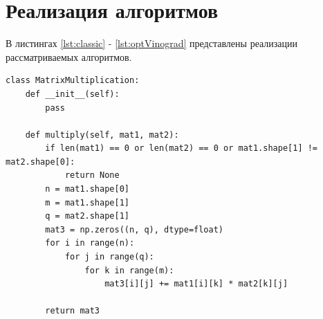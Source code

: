 \documentclass[a4paper,oneside,14pt]{extreport}
\begin{document}
\section{Реализация алгоритмов}
В листингах \ref{lst:classic} - \ref{lst:optVinograd} представлены реализации рассматриваемых алгоритмов.
\newpage
\captionsetup{singlelinecheck=false, justification=raggedright}
\begin{lstlisting}[caption=Классический алгоритм, label={lst:classic}]
class MatrixMultiplication:
	def __init__(self):
		pass
	
	def multiply(self, mat1, mat2):
		if len(mat1) == 0 or len(mat2) == 0 or mat1.shape[1] != mat2.shape[0]:
			return None
		n = mat1.shape[0]
		m = mat1.shape[1]
		q = mat2.shape[1]
		mat3 = np.zeros((n, q), dtype=float)
		for i in range(n):
			for j in range(q):
				for k in range(m):
					mat3[i][j] += mat1[i][k] * mat2[k][j]
		
		return mat3

\end{lstlisting}
\end{document}
